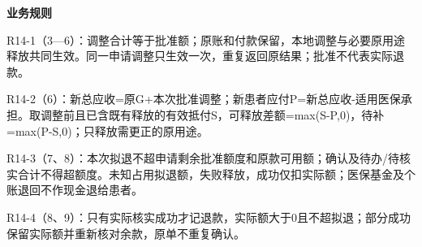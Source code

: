 \documentclass[UTF8,a4paper,zihao=-4,fontset=none]{ctexart}
\begin{document}
\smallskip
\noindent\textbf{业务规则}\par
\noindent R14-1（3—6）：调整合计等于批准额；原账和付款保留，本地调整与必要原用途释放共同生效。同一申请调整只生效一次，重复返回原结果；批准不代表实际退款。\par
\noindent R14-2（6）：新总应收=原G+本次批准调整；新患者应付P=新总应收-适用医保承担。取调整前且已含既有释放的有效抵付S，可释放差额=max(S-P,0)，待补=max(P-S,0)；只释放需更正的原用途。\par
\noindent R14-3（7、8）：本次拟退不超申请剩余批准额度和原款可用额；确认及待办/待核实合计不得超额度。未知占用拟退额，失败释放，成功仅扣实际额；医保基金及个账退回不作现金退给患者。\par
\noindent R14-4（8、9）：只有实际核实成功才记退款，实际额大于0且不超拟退；部分成功保留实际额并重新核对余款，原单不重复确认。\par
\endgroup
\clearpage
\end{document}

